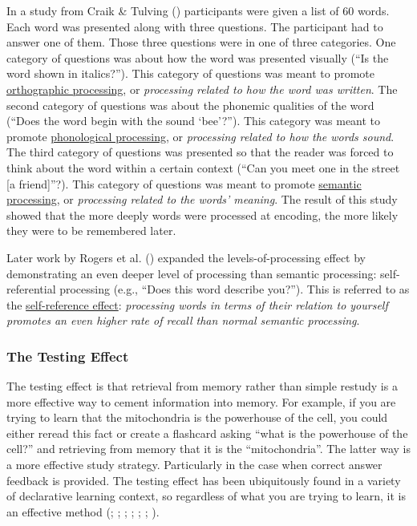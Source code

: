 \documentclass[
]{krantz}
\begin{document}
In a study from Craik \& Tulving () participants were given a list of 60 words. Each word was presented along with three questions. The participant had to answer one of them. Those three questions were in one of three categories. One category of questions was about how the word was presented visually (``Is the word shown in italics?''). This category of questions was meant to promote \hyperref[orthographic-processing]{orthographic processing}, or \emph{processing related to how the word was written}. The second category of questions was about the phonemic qualities of the word (``Does the word begin with the sound `bee'?''). This category was meant to promote \hyperref[phonological-processing]{phonological processing}, or \emph{processing related to how the words sound}. The third category of questions was presented so that the reader was forced to think about the word within a certain context (``Can you meet one in the street {[}a friend{]}''?). This category of questions was meant to promote \hyperref[semantic-processing]{semantic processing}, or \emph{processing related to the words' meaning}. The result of this study showed that the more deeply words were processed at encoding, the more likely they were to be remembered later.

Later work by Rogers et al. () expanded the levels-of-processing effect by demonstrating an even deeper level of processing than semantic processing: self-referential processing (e.g., ``Does this word describe you?''). This is referred to as the \hyperref[self-reference-effect]{self-reference effect}: \emph{processing words in terms of their relation to yourself promotes an even higher rate of recall than normal semantic processing}.

\subsubsection*{The Testing Effect}\label{the-testing-effect}


The testing effect is that retrieval from memory rather than simple restudy is a more effective way to cement information into memory. For example, if you are trying to learn that the mitochondria is the powerhouse of the cell, you could either reread this fact or create a flashcard asking ``what is the powerhouse of the cell?'' and retrieving from memory that it is the ``mitochondria''. The latter way is a more effective study strategy. Particularly in the case when correct answer feedback is provided. The testing effect has been ubiquitously found in a variety of declarative learning context, so regardless of what you are trying to learn, it is an effective method (; ; ; ; ; ; ).
\end{document}

